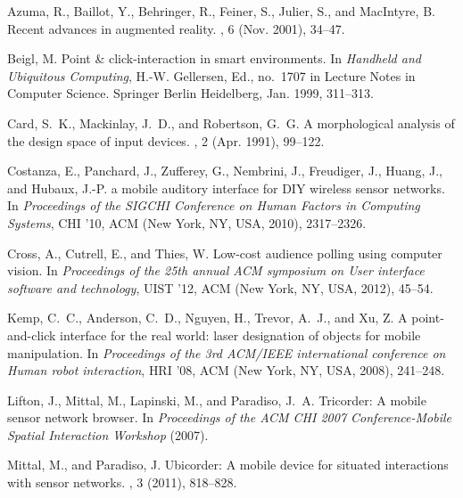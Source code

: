\documentclass{sigchi}
\begin{document}

\begin{thebibliography}{10}

Azuma, R., Baillot, Y., Behringer, R., Feiner, S., Julier, S., and {MacIntyre},
  B.
\newblock Recent advances in augmented reality.
, 6 (Nov. 2001), 34–47.

Beigl, M.
\newblock Point \& click-interaction in smart environments.
\newblock In {\em Handheld and Ubiquitous Computing}, H.-W. Gellersen, Ed.,
  no.~1707 in Lecture Notes in Computer Science. Springer Berlin Heidelberg,
  Jan. 1999, 311--313.

Card, S.~K., Mackinlay, J.~D., and Robertson, G.~G.
\newblock A morphological analysis of the design space of input devices.
, 2 (Apr. 1991), 99–122.

Costanza, E., Panchard, J., Zufferey, G., Nembrini, J., Freudiger, J., Huang,
  J., and Hubaux, J.-P.
 a mobile auditory interface for {DIY} wireless sensor
  networks.
\newblock In {\em Proceedings of the {SIGCHI} Conference on Human Factors in
  Computing Systems}, {CHI} '10, {ACM} (New York, {NY}, {USA}, 2010),
  2317–2326.

Cross, A., Cutrell, E., and Thies, W.
\newblock Low-cost audience polling using computer vision.
\newblock In {\em Proceedings of the 25th annual {ACM} symposium on User
  interface software and technology}, {UIST} '12, {ACM} (New York, {NY}, {USA},
  2012), 45–54.

Kemp, C.~C., Anderson, C.~D., Nguyen, H., Trevor, A.~J., and Xu, Z.
\newblock A point-and-click interface for the real world: laser designation of
  objects for mobile manipulation.
\newblock In {\em Proceedings of the 3rd {ACM/IEEE} international conference on
  Human robot interaction}, {HRI} '08, {ACM} (New York, {NY}, {USA}, 2008),
  241–248.

Lifton, J., Mittal, M., Lapinski, M., and Paradiso, J.~A.
\newblock Tricorder: A mobile sensor network browser.
\newblock In {\em Proceedings of the {ACM} {CHI} 2007 Conference-Mobile Spatial
  Interaction Workshop} (2007).

Mittal, M., and Paradiso, J.
\newblock Ubicorder: A mobile device for situated interactions with sensor
  networks.
, 3 (2011), 818--828.


\end{thebibliography}
\end{document}
